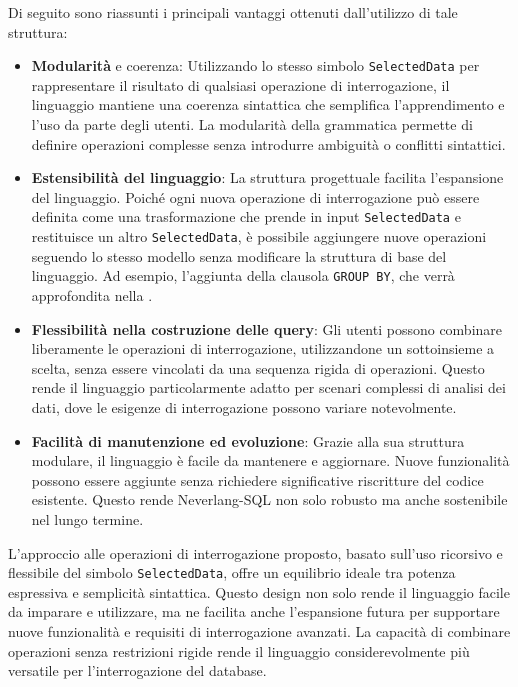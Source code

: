 \documentclass[12pt,a4paper,openright,twoside]{book}
\begin{document}
Di seguito sono riassunti i principali vantaggi ottenuti dall’utilizzo di tale struttura:
\begin{itemize}
    \item \textbf{Modularità} e coerenza: Utilizzando lo stesso simbolo \texttt{SelectedData} per rappresentare il risultato di qualsiasi 
    operazione di interrogazione, il linguaggio mantiene una coerenza sintattica che semplifica l’apprendimento e l’uso da parte degli 
    utenti. La modularità della grammatica permette di definire operazioni complesse senza introdurre ambiguità o conflitti sintattici.
    \item \textbf{Estensibilità del linguaggio}: La struttura progettuale facilita l’espansione del linguaggio. Poiché ogni nuova operazione di 
    interrogazione può essere definita come una trasformazione che prende in input \texttt{SelectedData} e restituisce un altro 
    \texttt{SelectedData}, è possibile aggiungere nuove operazioni seguendo lo stesso modello senza modificare la struttura di base del 
    linguaggio. Ad esempio, l’aggiunta della clausola \texttt{GROUP BY}, che verrà approfondita nella .
    \item \textbf{Flessibilità nella costruzione delle query}: Gli utenti possono combinare liberamente le operazioni di interrogazione, 
    utilizzandone un sottoinsieme a scelta, senza essere vincolati da una sequenza rigida di operazioni. Questo rende il linguaggio 
    particolarmente adatto per scenari complessi di analisi dei dati, dove le esigenze di interrogazione possono variare notevolmente.
    \item \textbf{Facilità di manutenzione ed evoluzione}: Grazie alla sua struttura modulare, il linguaggio è facile da mantenere e 
aggiornare. Nuove funzionalità possono essere aggiunte senza richiedere significative riscritture del codice esistente. Questo 
rende Neverlang-SQL non solo robusto ma anche sostenibile nel lungo termine.
\end{itemize}

L’approccio alle operazioni di interrogazione proposto, basato sull’uso ricorsivo e flessibile del simbolo \texttt{SelectedData}, 
offre un equilibrio ideale tra potenza espressiva e semplicità sintattica. Questo design non solo rende il linguaggio facile da 
imparare e utilizzare, ma ne facilita anche l’espansione futura per supportare nuove funzionalità e requisiti di interrogazione 
avanzati. La capacità di combinare operazioni senza restrizioni rigide rende il linguaggio considerevolmente più versatile per 
l’interrogazione del database.
\end{document}
